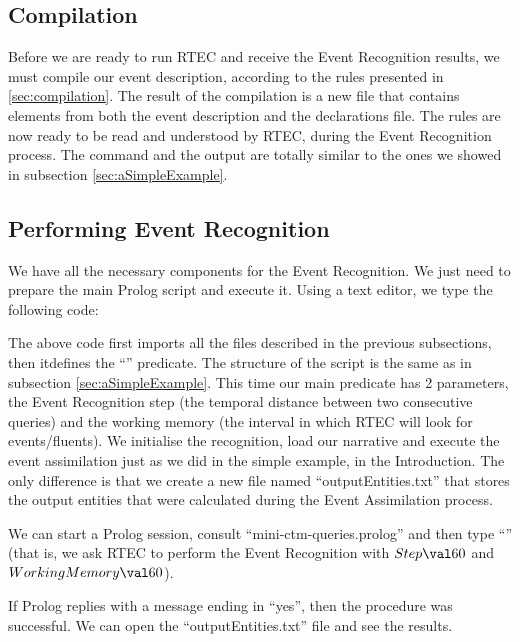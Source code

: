 \subsection{Compilation}\label{sec:ctm-compilation}

Before we are ready to run RTEC and receive the Event Recognition results, we must compile our event description, according to the rules presented in \ref{sec:compilation}. The result of the compilation is a new file that contains elements from both the event description and the declarations file. The rules are now ready to be read and understood by RTEC, during the Event Recognition process. The command and the output are totally similar to the ones we showed in subsection \ref{sec:aSimpleExample}.

\subsection{Performing Event Recognition}\label{sec:ctm-execution}

We have all the necessary components for the Event Recognition. We just need to prepare the main Prolog script and execute it. Using a text editor, we type the following code:



The above code first imports all the files described in the previous subsections, then itdefines the ``'' predicate. The structure of the script is the same as in subsection \ref{sec:aSimpleExample}. This time our main predicate has 2 parameters, the Event Recognition step (the temporal distance between two consecutive queries) and the working memory (the interval in which RTEC will look for events/fluents). We initialise the recognition, load our narrative and execute the event assimilation just as we did in the simple example, in the Introduction. The only difference is that we create a new file named ``outputEntities.txt'' that stores the output entities that were calculated during the Event Assimilation process.

We can start a Prolog session, consult ``mini-ctm-queries.prolog'' and then type ``'' (that is, we ask RTEC to perform the Event Recognition with $Step\val 60$ and $Working Memory\val 60$).

If Prolog replies with a message ending in ``yes'', then the procedure was successful. We can open the ``outputEntities.txt'' file and see the results.


